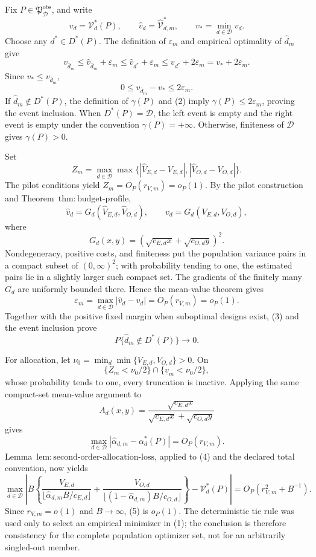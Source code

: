 Fix \(P\in\mathfrak P_{\mathcal D}^{\mathrm{obs}}\), and write
\[
 v_d=\mathcal V_d^*(P),
 \qquad
 \widehat v_d=\widehat{\mathcal V}_{d,m}^*,
 \qquad
 v_*=\min_{d\in\mathcal D}v_d.
\]
Choose any \(d^*\in D^*(P)\).  The definition of \(\varepsilon_m\) and empirical optimality of \(\widehat d_m\) give
\[
 v_{\widehat d_m}
 \le\widehat v_{\widehat d_m}+\varepsilon_m
 \le\widehat v_{d^*}+\varepsilon_m
 \le v_{d^*}+2\varepsilon_m
 =v_*+2\varepsilon_m.                                     \tag{1}
\]
Since \(v_*\le v_{\widehat d_m}\),
\[
 0\le v_{\widehat d_m}-v_*\le2\varepsilon_m.             \tag{2}
\]
If \(\widehat d_m\notin D^*(P)\), the definition of \(\gamma(P)\) and (2) imply \(\gamma(P)\le2\varepsilon_m\), proving the event inclusion.  When \(D^*(P)=\mathcal D\), the left event is empty and the right event is empty under the convention \(\gamma(P)=+\infty\).  Otherwise, finiteness of \(\mathcal D\) gives \(\gamma(P)>0\).

Set
\[
 Z_m=\max_{d\in\mathcal D}\max\bigl\{
 |\widehat V_{E,d}-V_{E,d}|,
 |\widehat V_{O,d}-V_{O,d}|\bigr\}.
\]
The pilot conditions yield \(Z_m=O_P(r_{V,m})=o_P(1)\).  By the pilot construction and Theorem~\(\mathrm{thm{:}budget\text{-}profile}\),
\[
 \widehat v_d=G_d(\widehat V_{E,d},\widehat V_{O,d}),
 \qquad
 v_d=G_d(V_{E,d},V_{O,d}),
\]
where
\[
 G_d(x,y)=(\sqrt{c_{E,d}x}+\sqrt{c_{O,d}y})^2.
\]
Nondegeneracy, positive costs, and finiteness put the population variance pairs in a compact subset of \((0,\infty)^2\); with probability tending to one, the estimated pairs lie in a slightly larger such compact set.  The gradients of the finitely many \(G_d\) are uniformly bounded there.  Hence the mean-value theorem gives
\[
 \varepsilon_m=\max_{d\in\mathcal D}|\widehat v_d-v_d|
 =O_P(r_{V,m})=o_P(1).                                   \tag{3}
\]
Together with the positive fixed margin when suboptimal designs exist, (3) and the event inclusion prove
\[
 P\{\widehat d_m\notin D^*(P)\}\longrightarrow0.
\]

For allocation, let \(\nu_0=\min_d\min\{V_{E,d},V_{O,d}\}>0\).  On
\[
 \{Z_m<\nu_0/2\}\cap\{\underline v_m<\nu_0/2\},
\]
whose probability tends to one, every truncation is inactive.  Applying the same compact-set mean-value argument to
\[
 A_d(x,y)=\frac{\sqrt{c_{E,d}x}}
 {\sqrt{c_{E,d}x}+\sqrt{c_{O,d}y}}
\]
gives
\[
 \max_{d\in\mathcal D}
 |\widehat\alpha_{d,m}-\alpha_d^*(P)|=O_P(r_{V,m}).       \tag{4}
\]
Lemma~\(\mathrm{lem{:}second\text{-}order\text{-}allocation\text{-}loss}\), applied to (4) and the declared total convention, now yields
\[
\max_{d\in\mathcal D}\left|B\left\{
\frac{V_{E,d}}{\lfloor\widehat\alpha_{d,m}B/c_{E,d}\rfloor}
+\frac{V_{O,d}}{\lfloor(1-\widehat\alpha_{d,m})B/c_{O,d}\rfloor}
\right\}-\mathcal V_d^*(P)\right|
=O_P(r_{V,m}^2+B^{-1}).                                  \tag{5}
\]
Since \(r_{V,m}=o(1)\) and \(B\to\infty\), (5) is \(o_P(1)\).  The deterministic tie rule was used only to select an empirical minimizer in (1); the conclusion is therefore consistency for the complete population optimizer set, not for an arbitrarily singled-out member.
